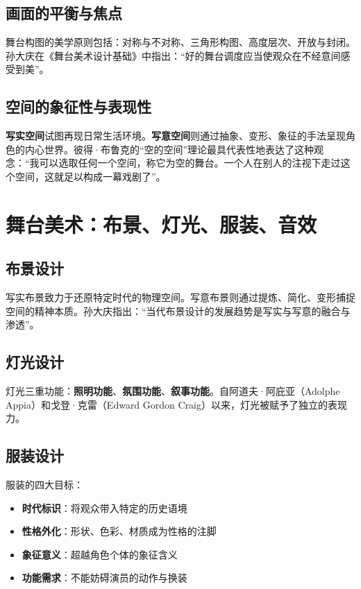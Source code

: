 \subsection{画面的平衡与焦点}

舞台构图的美学原则包括：对称与不对称、三角形构图、高度层次、开放与封闭。孙大庆在《舞台美术设计基础》中指出：\enquote{好的舞台调度应当使观众在不经意间感受到美}\cite{sun:stage}。

\subsection{空间的象征性与表现性}

\textbf{写实空间}试图再现日常生活环境。\textbf{写意空间}则通过抽象、变形、象征的手法呈现角色的内心世界。彼得·布鲁克的\enquote{空的空间}理论最具代表性地表达了这种观念：\enquote{我可以选取任何一个空间，称它为空的舞台。一个人在别人的注视下走过这个空间，这就足以构成一幕戏剧了}\cite{brook:space}。

\section{舞台美术：布景、灯光、服装、音效}

\subsection{布景设计}

写实布景致力于还原特定时代的物理空间。写意布景则通过提炼、简化、变形捕捉空间的精神本质。孙大庆指出：\enquote{当代布景设计的发展趋势是写实与写意的融合与渗透}\cite{sun:stage}。

\subsection{灯光设计}

灯光三重功能：\textbf{照明功能}、\textbf{氛围功能}、\textbf{叙事功能}。自阿道夫·阿庇亚（Adolphe Appia）和戈登·克雷（Edward Gordon Craig）以来，灯光被赋予了独立的表现力。

\subsection{服装设计}

服装的四大目标：
\begin{itemize}
  \item \textbf{时代标识}：将观众带入特定的历史语境
  \item \textbf{性格外化}：形状、色彩、材质成为性格的注脚
  \item \textbf{象征意义}：超越角色个体的象征含义
  \item \textbf{功能需求}：不能妨碍演员的动作与换装
\end{itemize}

